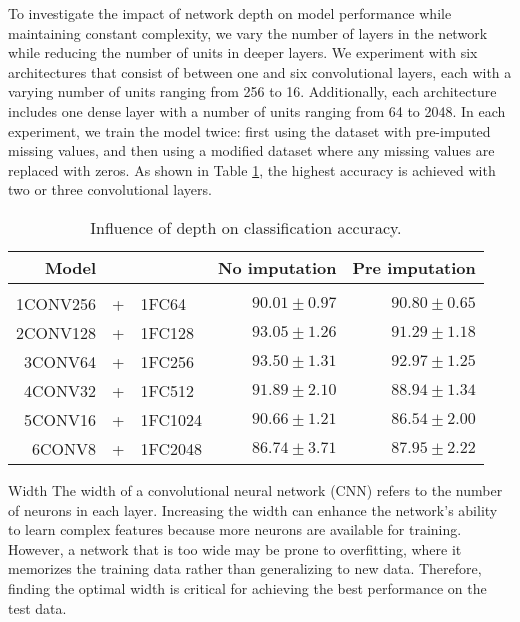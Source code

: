 To investigate the impact of network depth on model performance while maintaining constant complexity, we vary the number of layers in the network while reducing the number of units in deeper layers.
We experiment with six architectures that consist of between one and six convolutional layers, each with a varying number of units ranging from 256 to 16.
Additionally, each architecture includes one dense layer with a number of units ranging from 64 to 2048. 
In each experiment, we train the model twice: first using the dataset with pre-imputed missing values, and then using a modified dataset where any missing values are replaced with zeros.
As shown in Table \ref{tab:temCNNdepth}, the highest accuracy is achieved with two or three convolutional layers.

\begin{table}[!htbp]
  \centering
   \begin{tabular}{rclrr}
   Model&&                  & No imputation         & Pre imputation             \\[0.2cm]
   \hline \\[-0.2cm]
    1CONV256 &+& 1FC64   	 & $90.01 \pm 0.97$ 	 & $90.80 \pm 0.65$\\
    2CONV128 &+& 1FC128    & $93.05 \pm 1.26$ 	 & $91.29 \pm 1.18$\\
    3CONV64 &+& 1FC256  	 & $\mathbf{93.50 \pm 1.31}$ 	 & $\mathbf{92.97 \pm 1.25}$\\
    4CONV32 &+& 1FC512   	 & $91.89 \pm 2.10$ 	 & $88.94 \pm 1.34$\\
    5CONV16 &+& 1FC1024  	 & $90.66 \pm 1.21$ 	 & $86.54 \pm 2.00$\\
    6CONV8 &+& 1FC2048   	 & $86.74 \pm 3.71$ 	 & $87.95 \pm 2.22$\\
   \end{tabular}
   \caption{Influence of depth on classification accuracy.}
   \label{tab:temCNNdepth}
 \end{table}

\begin{paragraph}{Width}
The width of a convolutional neural network (CNN) refers to the number of neurons in each layer.
Increasing the width can enhance the network's ability to learn complex features because more neurons are available for training.
However, a network that is too wide may be prone to overfitting, where it memorizes the training data rather than generalizing to new data.
Therefore, finding the optimal width is critical for achieving the best performance on the test data.
\end{paragraph}

